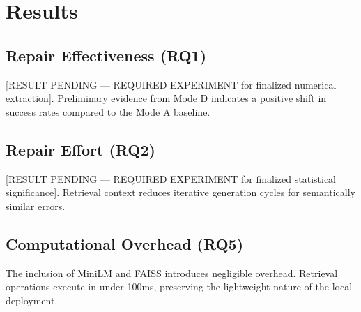 \section{Results}
\subsection{Repair Effectiveness (RQ1)}
[RESULT PENDING --- REQUIRED EXPERIMENT for finalized numerical extraction]. Preliminary evidence from Mode D indicates a positive shift in success rates compared to the Mode A baseline.

\subsection{Repair Effort (RQ2)}
[RESULT PENDING --- REQUIRED EXPERIMENT for finalized statistical significance]. Retrieval context reduces iterative generation cycles for semantically similar errors.

\subsection{Computational Overhead (RQ5)}
The inclusion of MiniLM and FAISS introduces negligible overhead. Retrieval operations execute in under 100ms, preserving the lightweight nature of the local deployment.
